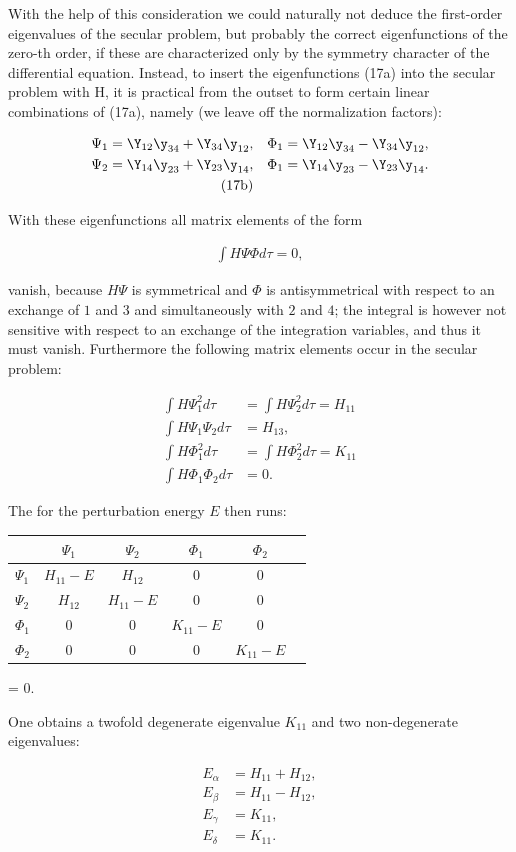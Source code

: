 \documentclass{article}
\newcommand{\nequ}[2]{
\begin{align*}
#1
\tag{#2}
\end{align*}
}
\newcommand{\uequ}[1]{
\begin{align*}
#1
\end{align*}
}
\begin{document}
With the help of this consideration we could naturally not deduce the first-order eigenvalues of the secular problem, but probably the correct eigenfunctions of the zero-th order, if these are characterized only by the symmetry character of the differential equation. Instead, to insert the eigenfunctions (17a) into the secular problem with H, it is practical from the outset to form certain linear combinations of (17a), namely (we leave off the normalization factors):
\nequ{
\Psi_1 =
\Y_{12}\y_{34} + \Y_{34}\y_{12},& \quad \Phi_1 = \Y_{12}\y_{34} - \Y_{34}\y_{12},\\
\Psi_2 = \Y_{14}\y_{23} + \Y_{23}\y_{14},& \quad \Phi_1 = \Y_{14}\y_{23} - \Y_{23}\y_{14}.\\}{17b}


With these eigenfunctions all matrix elements of the form
\uequ{
\int H\Psi\Phi d\tau = 0,
}
vanish, because $H\Psi$ is symmetrical and $\Phi$ is antisymmetrical with respect to an exchange of $1$ and $3$ and simultaneously with $2$ and $4$; the integral is however not sensitive with respect to an exchange of the integration variables, and thus it must vanish. Furthermore the following matrix elements occur in the secular problem:
\uequ{
\int H\Psi_1^2 d\tau &= \int H\Psi_2^2 d\tau = H_{11}\\
\int H\Psi_1 \Psi_2 d\tau &= H_{13},\\
\int H\Phi_1^2 d\tau &= \int H\Phi_2^2 d\tau = K_{11}\\
\int H\Phi_1 \Phi_2 d\tau &= 0.
}

The  for the perturbation energy $E$ then runs:

\begin{tabular}{l|cccc|l}
  \, & $\Psi_1$ & $\Psi_2$ & $\Phi_1$ & $\Phi_2$ \\
\hline
$\Psi_1$ & $H_{11} - E$ & $H_{12}$   & 0 & 0 \\
$\Psi_2$ & $H_{12}$     & $H_{11}-E$ & 0 & 0\\
$\Phi_1$ & 0            & 0          & $K_{11} - E$ & 0\\
$\Phi_2$ & 0            & 0          & 0 & $K_{11} - E$
\end{tabular}
= 0.

One obtains a twofold degenerate eigenvalue $K_{11}$ and two non-degenerate eigenvalues:
\nequ{
E_\alpha &= H_{11} + H_{12},\\
E_\beta  &= H_{11} - H_{12},\\
E_\gamma &= K_{11},\\
E_\delta &= K_{11}.
}{19}
\end{document}
